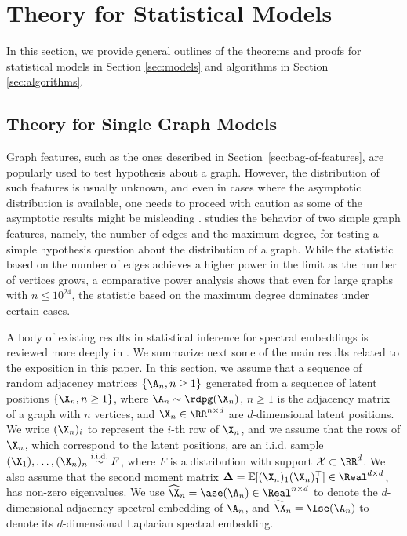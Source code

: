 
\section{Theory for Statistical Models}
In this section, we provide general outlines of the theorems and proofs for statistical models in Section \ref{sec:models} and algorithms in Section \ref{sec:algorithms}.

\subsection{Theory for Single Graph Models}\label{sec:theory_single}

Graph features, such as the ones described in Section~\ref{sec:bag-of-features}, are popularly used to test hypothesis about a graph. However,  the distribution of such features is usually unknown, and even in cases where the asymptotic distribution is available, one needs to proceed with caution as some of the asymptotic results might be misleading \cite{priebe2010you}.  \cite{Rukhin2010} studies the behavior of two simple graph features, namely, the number of edges and the maximum  degree, for testing a simple hypothesis question about the distribution of a graph. While the statistic based on the number of edges achieves a higher power in the limit as the number of vertices grows, a comparative power analysis shows that even for large graphs with $n\leq 10^{24}$, the statistic based on the maximum degree dominates under certain cases.

A body of existing results in statistical inference for spectral embeddings is reviewed more deeply in \cite{athreya2017statistical}. We summarize next some of the main results related to the exposition in this paper. 
In this section, we assume that a sequence of random adjacency  matrices $\{\A_n, n\geq 1\}$ generated from a sequence of latent positions $\{\X_n, n\geq 1\}$, where  $\A_n\sim \rdpg(\X_n)$, $n\geq 1$ is the adjacency matrix of a graph with $n$ vertices, and $\X_n\in\RR^{n\times d}$ are $d$-dimensional latent positions. We write $(\X_n)_i$ to represent the $i$-th row of $\X_n$, and we assume that the rows of $\X_n$, which correspond to the latent positions, are an i.i.d. sample $(\X_1), \ldots, (\X_n)_n\overset{\text{i.i.d.}}{\sim} F$, where $F$ is a distribution with support $\mathcal{X}\subset\RR^d$. We also  assume that the second moment matrix $\mathbf{\Delta} = \mathbb{E}[(\X_n)_1(\X_n)_1^\top]\in\Real^{d\times d}$, has non-zero eigenvalues.   We use $\widehat{\X}_n=\ase(\A_n)\in\Real^{n\times d}$ to denote the $d$-dimensional adjacency spectral embedding of $\A_n$, and $\widetilde{\X}_n = \lse(\A_n)$  to denote its $d$-dimensional Laplacian spectral embedding.


